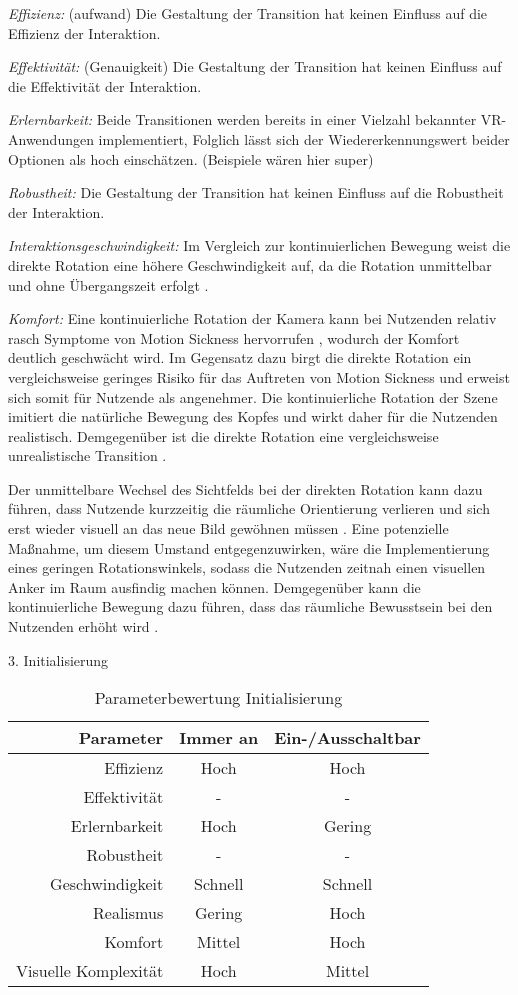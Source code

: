 \textit{Effizienz:}
(aufwand)
Die Gestaltung der Transition hat keinen Einfluss auf die Effizienz der Interaktion.

\textit{Effektivität:} 
(Genauigkeit)
Die Gestaltung der Transition hat keinen Einfluss auf die Effektivität der Interaktion.

\textit{Erlernbarkeit:}
Beide Transitionen werden bereits in einer Vielzahl bekannter VR-Anwendungen implementiert, Folglich lässt sich der Wiedererkennungswert beider Optionen als hoch einschätzen. (Beispiele wären hier super) 


\textit{Robustheit:}
Die Gestaltung der Transition hat keinen Einfluss auf die Robustheit der Interaktion. 

\textit{Interaktionsgeschwindigkeit:}
Im Vergleich zur kontinuierlichen Bewegung weist die direkte Rotation eine höhere Geschwindigkeit auf, da die Rotation unmittelbar und ohne Übergangszeit erfolgt \citep{8797722}. 

\textit{Komfort:}
Eine kontinuierliche Rotation der Kamera kann bei Nutzenden relativ rasch Symptome von Motion Sickness hervorrufen \citep{10.1007/s10055-020-00425-x, 8797722}, wodurch der Komfort deutlich geschwächt wird. Im Gegensatz dazu birgt die direkte Rotation ein vergleichsweise geringes Risiko für das Auftreten von Motion Sickness \citep{10.1007/s10055-020-00425-x, 8797722} und erweist sich somit für Nutzende als angenehmer.
Die kontinuierliche Rotation der Szene imitiert die natürliche Bewegung des Kopfes und wirkt daher für die Nutzenden realistisch. Demgegenüber ist die direkte Rotation eine vergleichsweise unrealistische Transition \citep{8797722}. 

Der unmittelbare Wechsel des Sichtfelds bei der direkten Rotation kann dazu führen, dass Nutzende kurzzeitig die räumliche Orientierung verlieren und sich erst wieder visuell an das neue Bild gewöhnen müssen \citep{10.1145/3441852.3471230}. Eine potenzielle Maßnahme, um diesem Umstand entgegenzuwirken, wäre die Implementierung eines geringen Rotationswinkels, sodass die Nutzenden zeitnah einen visuellen Anker im Raum ausfindig machen können. Demgegenüber kann die kontinuierliche Bewegung dazu führen, dass das räumliche Bewusstsein bei den Nutzenden erhöht wird \citep{10.1145/3441852.3471230}.

3. Initialisierung 

\begin{table}[ht]
 \centering
 \begin{tabular}{r|c|c}
 Parameter & Immer an & Ein-/Ausschaltbar\\
 \hline
 Effizienz & Hoch & Hoch\\
 Effektivität & - & -\\
 Erlernbarkeit & Hoch & Gering\\
 Robustheit & - & -\\
 Geschwindigkeit & Schnell & Schnell\\
 Realismus & Gering & Hoch \\
 Komfort & Mittel & Hoch\\
 Visuelle Komplexität & Hoch & Mittel
 \end{tabular}
 \caption{Parameterbewertung Initialisierung}
 \label{tab:Initial}
\end{table}

